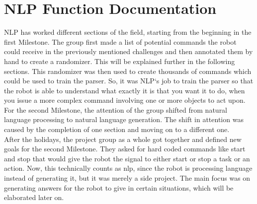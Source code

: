 \documentclass[main.tex]{subfiles}
\begin{document}
	\begingroup

	\renewcommand{\cleardoublepage}{}

	\renewcommand{\clearpage}{}

	\chapter{NLP Function Documentation}
	NLP has worked different sections of the field, starting from the beginning in the first Milestone. The group first made a list of potential commands the robot could receive in the previously mentioned challenges and then annotated them by hand to create a randomizer. This will be explained further in the following sections. This randomizer was then used to create thousands of commands which could be used to train the parser. So, it was NLP‘s job to train the parser so that the robot is able to understand what exactly it is that you want it to do, when you issue a more complex command involving one or more objects to act upon.\\ 
For the second Milestone, the attention of the group shifted from natural language processing to natural language generation. The shift in attention was caused by the completion of one section and moving on to a different one.\\ 
After the holidays, the project group as a whole got together and defined new goals for the second Milestone. They asked for hard coded commands like start and stop that would give the robot the signal to either start or stop a task or an action. Now, this technically counts as nlp, since the robot is processing language instead of generating it, but it was merely a side project. The main focus was on generating answers for the robot to give in certain situations, which will be elaborated later on.
		
\end{document}
